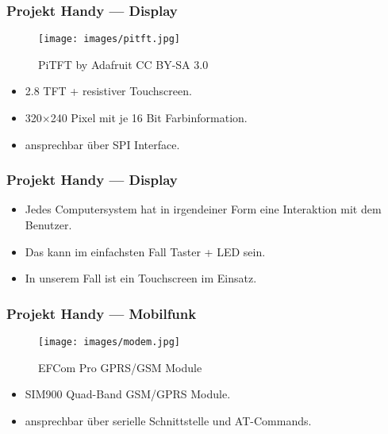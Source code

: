 \begin{frame}
	\frametitle{Projekt Handy --- Display}

	\begin{figure}
		\centering
		\texttt{[image: images/pitft.jpg]}
		\caption{PiTFT by Adafruit CC BY-SA 3.0}
	\end{figure}

	\vspace{-0.5cm}

	\begin{itemize}
		\item \SI{2.8}{\inch} TFT + resistiver Touchscreen.
		\item 320$\times$240 Pixel mit je 16 Bit Farbinformation.
		\item ansprechbar über SPI Interface.
	\end{itemize}
\end{frame}

\begin{frame}
	\frametitle{Projekt Handy --- Display}

	\begin{itemize}
		\item Jedes Computersystem hat in irgendeiner Form eine Interaktion mit
			dem Benutzer.
		\item Das kann im einfachsten Fall  Taster + LED sein.
		\item In unserem Fall ist ein Touchscreen im Einsatz.
	\end{itemize}
\end{frame}

\begin{frame}
	\frametitle{Projekt Handy --- Mobilfunk}
	\begin{figure}
		\centering
		\texttt{[image: images/modem.jpg]}
		\caption{EFCom Pro GPRS/GSM Module}
	\end{figure}

	\vspace{-0.5cm}

	\begin{itemize}
		\item SIM900 Quad-Band GSM/GPRS Module.
		\item ansprechbar über serielle Schnittstelle und AT-Commands.
	\end{itemize}
\end{frame}

